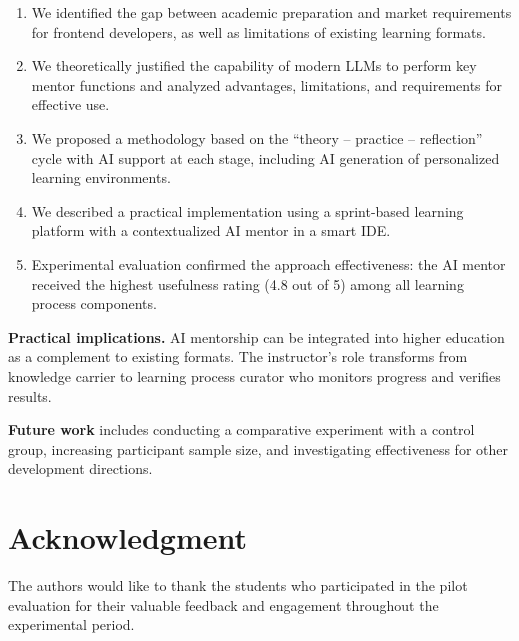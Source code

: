\documentclass[conference,a4paper]{IEEEtran}
\begin{document}
\begin{enumerate}
\item We identified the gap between academic preparation and market requirements for frontend developers, as well as limitations of existing learning formats.

\item We theoretically justified the capability of modern LLMs to perform key mentor functions and analyzed advantages, limitations, and requirements for effective use.

\item We proposed a methodology based on the ``theory -- practice -- reflection'' cycle with AI support at each stage, including AI generation of personalized learning environments.

\item We described a practical implementation using a sprint-based learning platform with a contextualized AI mentor in a smart IDE.

\item Experimental evaluation confirmed the approach effectiveness: the AI mentor received the highest usefulness rating (4.8 out of 5) among all learning process components.
\end{enumerate}

\textbf{Practical implications.} AI mentorship can be integrated into higher education as a complement to existing formats. The instructor's role transforms from knowledge carrier to learning process curator who monitors progress and verifies results.

\textbf{Future work} includes conducting a comparative experiment with a control group, increasing participant sample size, and investigating effectiveness for other development directions.

\section*{Acknowledgment}

The authors would like to thank the students who participated in the pilot evaluation for their valuable feedback and engagement throughout the experimental period.
\end{document}
